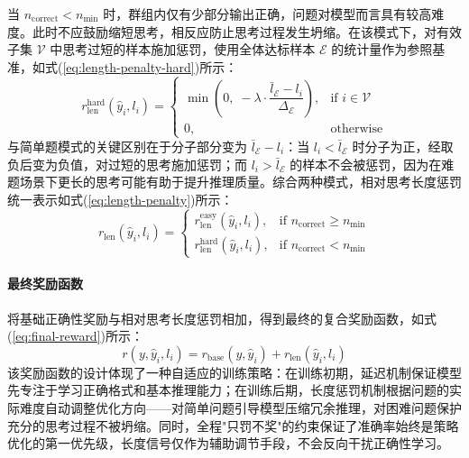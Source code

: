 当 $n_{\text{correct}} < n_{\min}$ 时，群组内仅有少部分输出正确，问题对模型而言具有较高难度。此时不应鼓励缩短思考，相反应防止思考过程发生坍缩。在该模式下，对有效子集 $\mathcal{V}$ 中思考过短的样本施加惩罚，使用全体达标样本 $\mathcal{E}$ 的统计量作为参照基准，如式(\ref{eq:length-penalty-hard})所示：
\begin{equation}\label{eq:length-penalty-hard}
  r_{\text{len}}^{\text{hard}}(\hat{y}_i, l_i) =
  \begin{cases}
    \min\!\left(0,\; -\lambda \cdot \dfrac{\bar{l}_{\mathcal{E}} - l_i}{\Delta_{\mathcal{E}}}\right), & \text{if } i \in \mathcal{V} \\
    0, & \text{otherwise}
  \end{cases}
\end{equation}
与简单题模式的关键区别在于分子部分变为 $\bar{l}_{\mathcal{E}} - l_i$：当 $l_i < \bar{l}_{\mathcal{E}}$ 时分子为正，经取负后变为负值，对过短的思考施加惩罚；而 $l_i > \bar{l}_{\mathcal{E}}$ 的样本不会被惩罚，因为在难题场景下更长的思考可能有助于提升推理质量。综合两种模式，相对思考长度惩罚统一表示如式(\ref{eq:length-penalty})所示：
\begin{equation}\label{eq:length-penalty}
  r_{\text{len}}(\hat{y}_i, l_i) =
  \begin{cases}
    r_{\text{len}}^{\text{easy}}(\hat{y}_i, l_i), & \text{if } n_{\text{correct}} \geq n_{\min} \\
    r_{\text{len}}^{\text{hard}}(\hat{y}_i, l_i), & \text{if } n_{\text{correct}} < n_{\min}
  \end{cases}
\end{equation}

\paragraph{最终奖励函数}

将基础正确性奖励与相对思考长度惩罚相加，得到最终的复合奖励函数，如式(\ref{eq:final-reward})所示：
\begin{equation}\label{eq:final-reward}
  r(y, \hat{y}_i, l_i) = r_{\text{base}}(y, \hat{y}_i) + r_{\text{len}}(\hat{y}_i, l_i)
\end{equation}
该奖励函数的设计体现了一种自适应的训练策略：在训练初期，延迟机制保证模型先专注于学习正确格式和基本推理能力；在训练后期，长度惩罚机制根据问题的实际难度自动调整优化方向——对简单问题引导模型压缩冗余推理，对困难问题保护充分的思考过程不被坍缩。同时，全程"只罚不奖"的约束保证了准确率始终是策略优化的第一优先级，长度信号仅作为辅助调节手段，不会反向干扰正确性学习。

